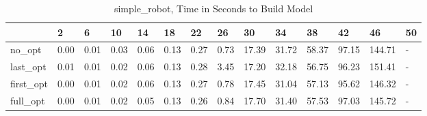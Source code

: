 \begin{table}
\caption{simple_robot, Time in Seconds to Build Model}
\label{simple_robot_model_time}
\begin{tabular}{llllllllllllll}
\toprule
 & 2 & 6 & 10 & 14 & 18 & 22 & 26 & 30 & 34 & 38 & 42 & 46 & 50 \\
\midrule
no_opt & 0.00 & 0.01 & 0.03 & 0.06 & 0.13 & 0.27 & 0.73 & 17.39 & 31.72 & 58.37 & 97.15 & 144.71 & - \\
last_opt & 0.01 & 0.01 & 0.02 & 0.06 & 0.13 & 0.28 & 3.45 & 17.20 & 32.18 & 56.75 & 96.23 & 151.41 & - \\
first_opt & 0.00 & 0.01 & 0.02 & 0.06 & 0.13 & 0.27 & 0.78 & 17.45 & 31.04 & 57.13 & 95.62 & 146.32 & - \\
full_opt & 0.00 & 0.01 & 0.02 & 0.05 & 0.13 & 0.26 & 0.84 & 17.70 & 31.40 & 57.53 & 97.03 & 145.72 & - \\
\bottomrule
\end{tabular}
\end{table}
